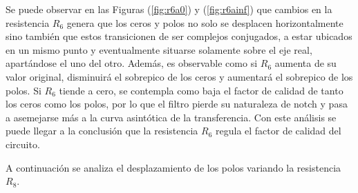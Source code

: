 Se puede observar en las Figuras (\ref{fig:r6a0}) y (\ref{fig:r6ainf}) que cambios en la resistencia $R_6$ genera que los ceros y polos no solo se desplacen horizontalmente sino también que estos transicionen de ser complejos conjugados, a estar ubicados en un mismo punto y eventualmente situarse solamente sobre el eje real, apartándose el uno del otro. Además, es observable como si $R_6$ aumenta de su valor original, disminuirá el sobrepico de los ceros y aumentará el sobrepico de los polos. Si $R_6$ tiende a cero, se contempla como baja el factor de calidad de tanto los ceros como los polos, por lo que el filtro pierde su naturaleza de notch y pasa a asemejarse más a la curva asintótica de la transferencia. Con este análisis se puede llegar a la conclusión que la resistencia $R_6$ regula el factor de calidad del circuito.


A continuación se analiza el desplazamiento de los polos variando la resistencia $R_8$. 

